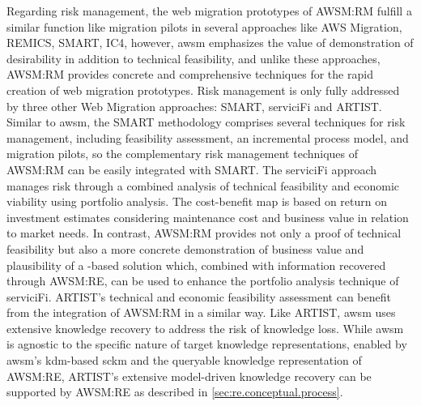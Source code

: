 Regarding \gls{risk management}, the \glspl{web migration prototype} of AWSM:RM fulfill a similar function like migration pilots in several approaches like AWS Migration, REMICS, SMART, IC4, however, \gls{awsm} emphasizes the value of demonstration of desirability in addition to technical feasibility, and unlike these approaches, AWSM:RM provides concrete and comprehensive techniques for the rapid creation of \glspl{web migration prototype}.
Risk management is only fully addressed by three other \gls{Web Migration} approaches: SMART, serviciFi and ARTIST.
Similar to \gls{awsm}, the SMART methodology comprises several techniques for \gls{risk management}, including feasibility assessment, an incremental process model, and migration pilots, so the complementary \gls{risk management} techniques of AWSM:RM can be easily integrated with SMART.
The serviciFi approach manages risk through a combined analysis of technical feasibility and economic viability using portfolio analysis.
The cost-benefit map is based on return on investment estimates considering maintenance cost and business value in relation to market needs.
In contrast, AWSM:RM provides not only a proof of technical feasibility but also a more concrete demonstration of business value and plausibility of a -based solution which, combined with information recovered through AWSM:RE, can be used to enhance the portfolio analysis technique of serviciFi.
ARTIST's technical and economic feasibility assessment can benefit from the integration of AWSM:RM in a similar way.
Like ARTIST, \gls{awsm} uses extensive knowledge recovery to address the risk of knowledge loss.
While \gls{awsm} is agnostic to the specific nature of target knowledge representations, enabled by \gls{awsm}'s \gls{kdm}-based \gls{sckm} and the queryable knowledge representation of AWSM:RE, ARTIST's extensive model-driven knowledge recovery can be supported by AWSM:RE as described in \cref{sec:re.conceptual.process}.


